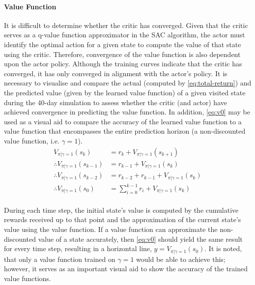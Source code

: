 \paragraph{Value Function}
It is difficult to determine whether the critic has converged. Given that the critic serves as a q-value function approximator in the SAC algorithm, the actor must identify the optimal action for a given state to compute the value of that state using the critic. Therefore, convergence of the value function is also dependent upon the actor policy. Although the training curves indicate that the critic has converged, it has only converged in alignment with the actor’s policy. It is necessary to visualise and compare the actual (computed by \autoref{eq:total-return}) and the predicted value (given by the learned value function) of a given visited state during the 40-day simulation to assess whether the critic (and actor) have achieved convergence in predicting the value function. In addition, \autoref{eq:v0} may be used as a visual aid to compare the accuracy of the learned value function to a value function that encompasses the entire prediction horizon (a non-discounted value function, i.e. $\gamma = 1$).
\begin{equation}\label{eq:v0}
	\begin{aligned}
		V_{\pi|\gamma = 1}(s_k) &= r_k + V_{\pi|\gamma = 1}(s_{k+1}) \\
		\therefore V_{\pi|\gamma = 1}(s_{k-1}) &= r_{k-1} + V_{\pi|\gamma = 1}(s_{k}) \\
		\therefore V_{\pi|\gamma = 1}(s_{k-2}) &= r_{k-2} + r_{k-1} + V_{\pi|\gamma = 1}(s_{k}) \\
		\therefore V_{\pi|\gamma = 1}(s_{0}) &= \sum_{i=0}^{k-1} {r_{i}} + V_{\pi|\gamma = 1}(s_{k})   \\
	\end{aligned}
\end{equation}

During each time step, the initial state’s value is computed by the cumulative rewards received up to that point and the approximation of the current state’s value using the value function. If a value function can approximate the non-discounted value of a state accurately, then \autoref{eq:v0} should yield the same result for every time step, resulting in a horizontal line, $y = V_{\pi|\gamma = 1}(s_0)$. It is noted, that only a value function trained on $\gamma = 1$ would be able to achieve this; however, it serves as an important visual aid to show the accuracy of the trained value functions.

